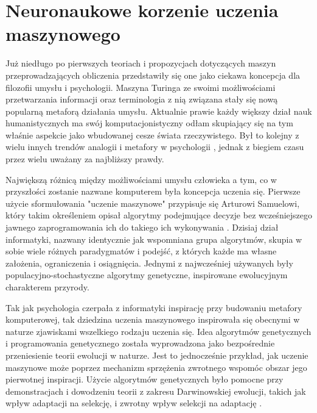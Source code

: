 \chapter{Neuronaukowe korzenie uczenia maszynowego}

Już niedługo po pierwszych teoriach i propozycjach dotyczących maszyn przeprowadzających obliczenia przedstawiły się one jako ciekawa koncepcja dla filozofii umysłu i psychologii.
Maszyna Turinga ze swoimi możliwościami przetwarzania informacji oraz terminologia z nią związana stały się nową popularną metaforą działania umysłu.
Aktualnie prawie każdy większy dział nauk humanistycznych ma swój komputacjonistyczny odłam skupiający się na tym właśnie aspekcie jako wbudowanej cesze świata rzeczywistego.
Był to kolejny z wielu innych trendów analogii i metafory w psychologii \cite{vroon1987man}, jednak z biegiem czasu przez wielu uważany za najbliższy prawdy.

Największą różnicą między możliwościami umysłu człowieka a tym, co w przyszłości zostanie nazwane komputerem była koncepcja uczenia się.
Pierwsze użycie sformułowania "uczenie maszynowe" przypisuje się Arturowi Samuelowi, który takim określeniem opisał algorytmy podejmujące decyzje bez wcześniejszego jawnego zaprogramowania ich do takiego ich wykonywania \cite{koza1996automated}.
Dzisiaj dział informatyki, nazwany identycznie jak wspomniana grupa algorytmów, skupia w sobie wiele różnych paradygmatów i podejść, z których każde ma własne założenia, ograniczenia i osiągnięcia.
Jednymi z najwcześniej używanych były populacyjno-stochastyczne algorytmy genetyczne, inspirowane ewolucyjnym charakterem przyrody.

Tak jak psychologia czerpała z informatyki inspirację przy budowaniu metafory komputerowej, tak dziedzina uczenia maszynowego inspirowała się obecnymi w naturze zjawiskami wszelkiego rodzaju uczenia się.
Idea algorytmów genetycznych i programowania genetycznego została wyprowadzona jako bezpośrednie przeniesienie teorii ewolucji w naturze.
Jest to jednocześnie przykład, jak uczenie maszynowe może poprzez mechanizm sprzężenia zwrotnego wspomóc obszar jego pierwotnej inspiracji.
Użycie algorytmów genetycznych było pomocne przy demonstracjach i dowodzeniu teorii z zakresu Darwinowskiej ewolucji, takich jak wpływ adaptacji na selekcję, i zwrotny wpływ selekcji na adaptację \cite{bruderer1996organizational}.

